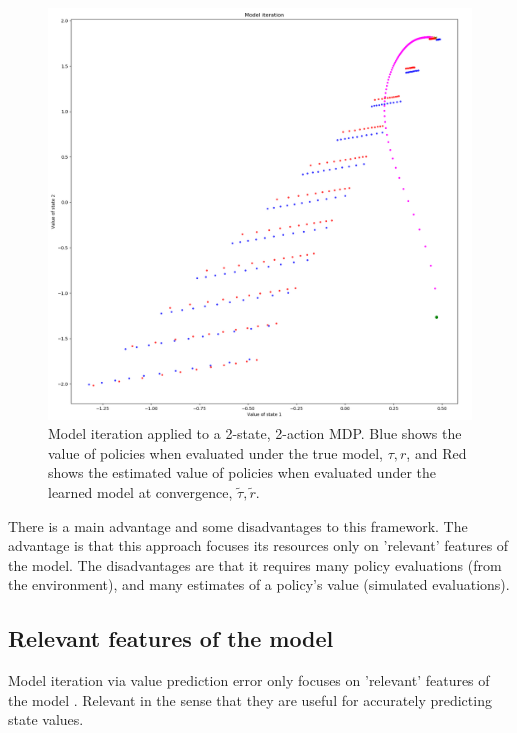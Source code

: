 \begin{figure}
\centering
\includegraphics[width=1.0\textwidth,height=0.8\textheight]{../../pictures/figures/model_iteration.png}
\caption{Model iteration applied to a 2-state, 2-action MDP.
Blue shows the value of policies when evaluated under the true model, $\tau, r$,
and Red shows the estimated value of policies when evaluated under the learned model at convergence, $\tilde \tau, \tilde r$.}
\end{figure}

There is a main advantage and some disadvantages to this framework.
The advantage is that this approach focuses its resources only on 'relevant' features of the model.
The disadvantages are that it requires many policy evaluations (from the environment),
and many estimates of a policy's value (simulated evaluations).

\subsection{Relevant features of the model}

Model iteration via value prediction error only focuses on 'relevant' features of the model \footnotemark.
Relevant in the sense that they are useful for accurately predicting state values.


